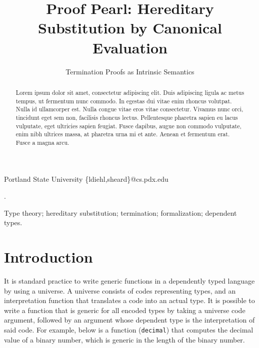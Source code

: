 \documentclass[preprint,nonatbib]{sigplanconf}
\numberwithin{mysubdfn}{mydfn}
\begin{document}
\setlength{\pdfpageheight}{\paperheight}
\setlength{\pdfpagewidth}{\paperwidth}


\title{Proof Pearl: Hereditary Substitution by Canonical Evaluation}
\subtitle{Termination Proofs as Intrinsic Semantics}

           {Portland State University}
           {\{ldiehl,sheard\}@cs.pdx.edu}

\maketitle

\begin{abstract}
Lorem ipsum dolor sit amet, consectetur adipiscing elit. Duis
adipiscing ligula ac metus tempus, ut fermentum nunc commodo. In
egestas dui vitae enim rhoncus volutpat. Nulla id ullamcorper est.
Nulla congue vitae eros vitae consectetur. Vivamus nunc orci,
tincidunt eget sem non, facilisis rhoncus lectus. Pellentesque
pharetra sapien eu lacus vulputate, eget ultricies sapien feugiat.
Fusce dapibus, augue non commodo vulputate, enim nibh ultrices massa,
at pharetra urna mi et ante. Aenean et fermentum erat. Fusce a magna
arcu.
\end{abstract}

.

\keywords
Type theory; hereditary substitution; termination; formalization; dependent types.

\section{Introduction}
\label{sec:intro}

It is standard practice to write generic functions in a dependently
typed language by using a \citet{martin1975intuitionistic} universe.
A universe consists of codes representing types, and an interpretation
function that translates a code into an actual type. It is possible to
write a function that is generic for all encoded types by taking a
universe code argument, followed by an argument whose dependent type
is the interpretation of said code. For example, below is a function
({\tt decimal}) that computes the decimal value of a binary number, which
is generic in the length of the binary number.
\end{document}

